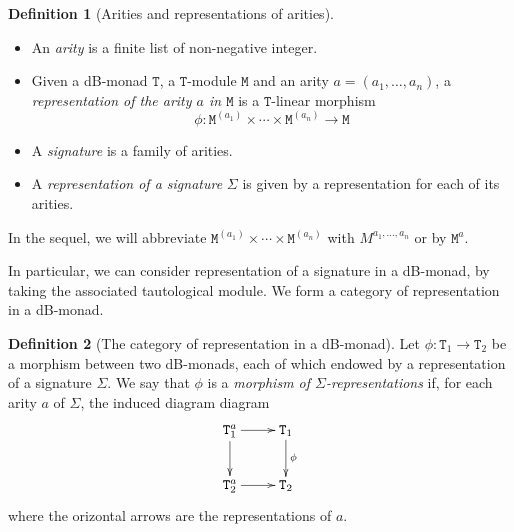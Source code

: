 \documentclass[a4paper,twoside,12pt,draft]{article}
\theoremstyle{definition}
\newtheorem{definition}{Definition}
\theoremstyle{remark}
\newcommand{\TT}{\mathtt{T}}
\newcommand{\MM}{\mathtt{M}}
\begin{document}
\begin{definition}[Arities and representations of arities]
  \hfill
  \begin{itemize}
  \item An \emph{arity} is a finite list of non-negative integer.
  \item Given a dB-monad $\TT$, a $\TT$-module $\MM$ and an arity
    $a=(a_1,\dots,a_n)$, a \emph{representation of the arity $a$ in
      $\MM$} is a $\TT$-linear morphism
    \begin{equation*}
      \phi:\MM^{(a_1)}\times\cdots\times\MM^{(a_n)} \longrightarrow \MM
    \end{equation*}
  \item A \emph{signature} is a family of arities.
  \item A \emph{representation of a signature} $\Sigma$ is given by a
    representation for each of its arities.
  \end{itemize}
\end{definition}

In the sequel, we will abbreviate
$\MM^{(a_1)}\times\cdots\times\MM^{(a_n)}$ with $M^{a_1,\dots,a_n}$ or
by $\MM^a$.

In particular, we can consider representation of a signature in a
dB-monad, by taking the associated tautological module.  We form a
category of representation in a dB-monad.

\begin{definition}[The category of representation in a dB-monad]
  Let $\phi \colon \TT_1 \to \TT_2$ be a morphism between two
  dB-monads, each of which endowed by a representation of a signature
  $\Sigma$.  We say that $\phi$ is a \emph{morphism of
    $\Sigma$-representations} if, for each arity $a$ of $\Sigma$, the
  induced diagram diagram
  \begin{equation*}
    \xymatrix{
      \TT_1^a\ar[d]\ar[r] & \TT_1\ar[d]^\phi \\
      \TT_2^a \ar[r] & \TT_2}
  \end{equation*}
  where the orizontal arrows are the representations of $a$.
\end{definition}


%

\end{document}
